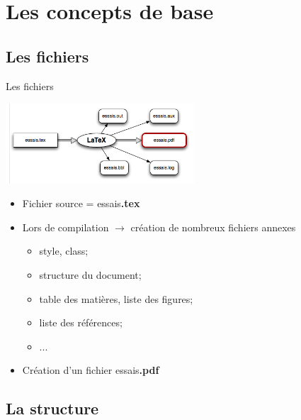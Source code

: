 \documentclass[10pt,svgnames,usenames,table]{beamer} %
\begin{document}
\section{Les concepts de base}
\subsection{Les fichiers}

\begin{frame}{Les fichiers}

	\begin{center}
		\includegraphics[height=3cm]{compilation.jpg}
	\end{center}

	\begin{itemize}
		\item Fichier source  = essais\alert{\textbf{.tex}}
		\item Lors de compilation $\rightarrow$ création de nombreux fichiers annexes
		\begin{itemize}
			\item style, class;
			\item structure du document;
			\item table des matières, liste des figures;
			\item liste des références;
			\item ...
		\end{itemize}
		\item Création d'un fichier essais\alert{\textbf{.pdf}}
	\end{itemize}
\end{frame}

\subsection{La structure}
\end{document}
